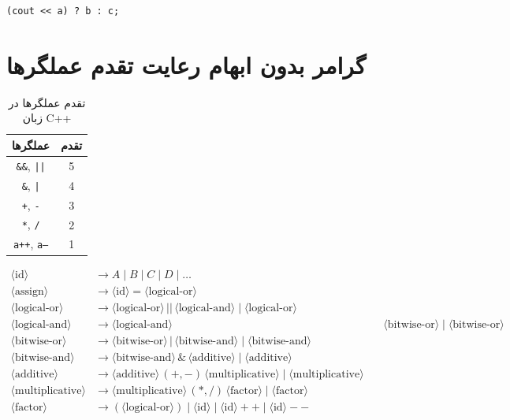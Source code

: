 \documentclass{article}
\begin{document}
\begin{LTR} %
\begin{lstlisting}
(cout << a) ? b : c;
\end{lstlisting}
\end{LTR}

\section*{گرامر بدون ابهام رعایت تقدم عملگر‌ها}

\begin{table}[h!]
    \centering
    \begin{tabular}{|c|c|}
        \hline
        \textbf{عملگرها} & \textbf{تقدم} \\
        \hline
        \texttt{\&\&}, \texttt{||} & 5 \\
        \hline
        \texttt{\&}, \texttt{|} & 4 \\
        \hline
        \texttt{+}, \texttt{-} & 3 \\
        \hline
        \texttt{*}, \texttt{/} & 2 \\
        \hline
        \texttt{a++}, \texttt{a--} & 1 \\
        \hline
    \end{tabular}
    \caption{تقدم عملگرها در زبان C++}
    \label{tab:operator_precedence}
\end{table}

\begin{align*}
\langle \text{id} \rangle &\to A \mid B \mid C \mid D \mid \dots \\
\langle \text{assign} \rangle &\to \langle \text{id} \rangle = \langle \text{logical-or} \rangle \\
\langle \text{logical-or} \rangle &\to \langle \text{logical-or} \rangle \, || \, \langle \text{logical-and} \rangle \mid \langle \text{logical-or} \rangle \\
\langle \text{logical-and} \rangle &\to \langle \text{logical-and} \rangle \, && \, \langle \text{bitwise-or} \rangle \mid \langle \text{bitwise-or} \rangle \\
\langle \text{bitwise-or} \rangle &\to \langle \text{bitwise-or} \rangle \, | \, \langle \text{bitwise-and} \rangle \mid \langle \text{bitwise-and} \rangle \\
\langle \text{bitwise-and} \rangle &\to \langle \text{bitwise-and} \rangle \, \& \, \langle \text{additive} \rangle \mid \langle \text{additive} \rangle \\
\langle \text{additive} \rangle &\to \langle \text{additive} \rangle \, (+, -) \, \langle \text{multiplicative} \rangle \mid \langle \text{multiplicative} \rangle \\
\langle \text{multiplicative} \rangle &\to \langle \text{multiplicative} \rangle \, (*, /) \, \langle \text{factor} \rangle \mid \langle \text{factor} \rangle \\
\langle \text{factor} \rangle &\to (\langle \text{logical-or} \rangle) \mid \langle \text{id} \rangle \mid \langle \text{id} \rangle++ \mid \langle \text{id} \rangle--
\end{align*}
\end{document}
